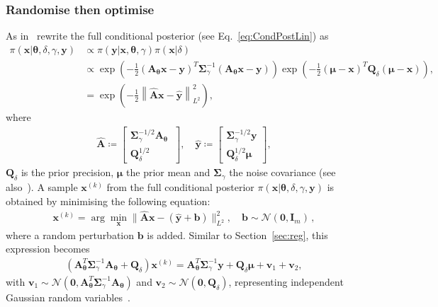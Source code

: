 \subsubsection{Randomise then optimise}
\label{subsec:RTO} 
As in~\cite{bardsley2012mcmc} rewrite the full conditional posterior (see Eq.~\ref{eq:CondPostLin}) as
\begin{align}
	\pi(\bm{x} | \bm{\theta},  \delta, \gamma, \bm{y}) & \propto \pi(\bm{y}|\bm{x},  \bm{\theta}, \gamma) \pi(\bm{x}| \delta)\\
	&\propto \exp \left(-\frac{1}{2} (\bm{A}_{\bm{\theta}}  \bm{x} - \bm{y})^T \bm{\Sigma}^{-1}_{\gamma} (\bm{A}_{\bm{\theta}}   \bm{x} - \bm{y})\right) \exp \left(-\frac{1}{2} (\bm{\mu} - \bm{x} )^T \bm{Q}_{\delta}(\bm{\mu} - \bm{x} ) \right),\\
	& = \exp \left( - \frac{1}{2}\left\lVert \hat{\bm{A}} \bm{x} - \hat{\bm{y}} \right\rVert_{L^2}^2 \right),
\end{align}
where
\begin{align}
	\label{eq:minimizer}
	\hat{\bm{A}} \coloneqq 
	\begin{bmatrix}
		\bm{\Sigma}_{\gamma}^{-1/2} \bm{A}_{\bm{\theta}} \ \\
		\bm{Q}_{\delta}^{1/2}
	\end{bmatrix}, \quad 
	\hat{\bm{y}} \coloneqq 
	\begin{bmatrix}
		\bm{\Sigma}_{\gamma}^{-1/2} \bm{y} \\
		\bm{Q}_{\delta}^{1/2} \bm{\mu}
	\end{bmatrix} , 
\end{align}
$\bm{Q}_{\delta}$ is the prior precision, $\bm{\mu}$ the prior mean and $\bm{\Sigma}_{\gamma}$ the noise covariance (see also~\cite{bardsley2014randomize,BardsleyTC2019RTO}).
A sample $\bm{x}^{(k)}$ from the full conditional posterior $ \pi(\bm{x}|   \bm{\theta},  \delta, \gamma,  \bm{y})$ is obtained by minimising the following equation:
\begin{align}
	\bm{x}^{(k)} = \arg \min_{\bm{x}} \lVert \hat{\bm{A}} \bm{x} - ( \hat{\bm{y}} + \bm{b} ) \rVert_{L^2}^2 , \quad \bm{b} \sim \mathcal{N}(\bm{0}, \bm{I}_m) \, ,
\end{align}
where a random perturbation $\bm{b}$ is added.
Similar to Section~\ref{sec:reg}, this expression becomes
\begin{align}
	\label{eq:RTO}
	\left( \bm{A}_{\bm{\theta}}^T \bm{\Sigma}^{-1}_{\gamma} \bm{A}_{\bm{\theta}} + \bm{Q}_{\delta} \right) \bm{x}^{(k)} = \bm{A}_{\bm{\theta}}^T \bm{\Sigma}^{-1}_{\gamma} \bm{y} + \bm{Q}_{\delta} \bm{\mu} + \bm{v}_1 + \bm{v}_2,
\end{align}
with $\bm{v}_1 \sim \mathcal{N}(\bm{0}, \bm{A}_{\bm{\theta}}^T \bm{\Sigma}^{-1}_{\gamma} \bm{A}_{\bm{\theta}})$ and $\bm{v}_2 \sim \mathcal{N}(\bm{0}, \bm{Q}_{\delta})$, representing independent Gaussian random variables~\cite{bardsley2012mcmc, fox2016fast}.


